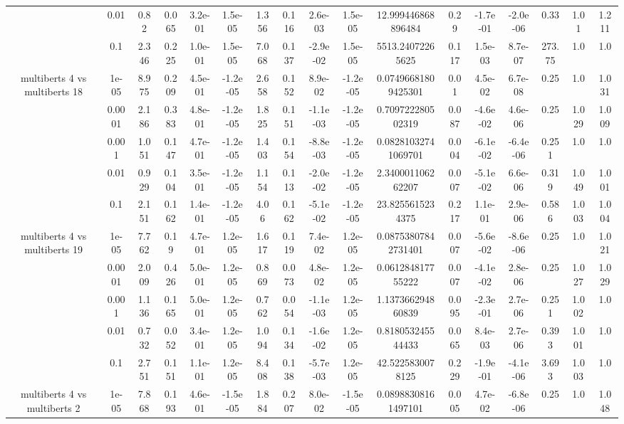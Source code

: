 \begin{tabular}{|c|c|c|c|c|c|c|c|c|c|c|c|c|c|c|c|c|}
 & 0.01 & 0.82 & 0.065 & 3.2e-01 & 1.5e-05 & 1.356 & 0.116 & 2.6e-03 & 1.5e-05 & 12.999446868896484 & 0.29 & -1.7e-01 & -2.0e-06 & 0.33 & 1.01 & 1.211 \\
 & 0.1 & 2.346 & 0.225 & 1.0e-01 & 1.5e-05 & 7.068 & 0.137 & -2.9e-02 & 1.5e-05 & 5513.24072265625 & 0.117 & 1.5e-03 & 8.7e-07 & 273.75 & 1.0 & 1.0 \\
\hline
\multirow{5}{*}{multiberts 4 vs multiberts 18} & 1e-05 & 8.975 & 0.209 & 4.5e-01 & -1.2e-05 & 2.658 & 0.152 & 8.9e-02 & -1.2e-05 & 0.07496681809425301 & 0.01 & 4.5e-02 & 6.7e-08 & 0.25 & 1.0 & 1.031 \\
 & 0.0001 & 2.186 & 0.383 & 4.8e-01 & -1.2e-05 & 1.825 & 0.151 & -1.1e-03 & -1.2e-05 & 0.709722280502319 & 0.087 & -4.6e-02 & 4.6e-06 & 0.25 & 1.029 & 1.009 \\
 & 0.001 & 1.051 & 0.147 & 4.7e-01 & -1.2e-05 & 1.403 & 0.154 & -8.8e-03 & -1.2e-05 & 0.08281032741069701 & 0.004 & -6.1e-02 & -6.4e-06 & 0.251 & 1.0 & 1.0 \\
 & 0.01 & 0.929 & 0.104 & 3.5e-01 & -1.2e-05 & 1.154 & 0.113 & -2.0e-02 & -1.2e-05 & 2.340001106262207 & 0.007 & -5.1e-02 & 6.6e-06 & 0.319 & 1.049 & 1.001 \\
 & 0.1 & 2.151 & 0.162 & 1.4e-01 & -1.2e-05 & 4.06 & 0.162 & -5.1e-02 & -1.2e-05 & 23.8255615234375 & 0.217 & 1.1e-01 & 2.9e-06 & 0.586 & 1.003 & 1.004 \\
\hline
\multirow{5}{*}{multiberts 4 vs multiberts 19} & 1e-05 & 7.762 & 0.19 & 4.7e-01 & 1.2e-05 & 1.617 & 0.119 & 7.4e-02 & 1.2e-05 & 0.08753807842731401 & 0.007 & -5.6e-02 & -8.6e-06 & 0.25 & 1.0 & 1.021 \\
 & 0.0001 & 2.009 & 0.426 & 5.0e-01 & 1.2e-05 & 0.869 & 0.073 & 4.8e-02 & 1.2e-05 & 0.061284817755222 & 0.007 & -4.1e-02 & 2.8e-06 & 0.25 & 1.027 & 1.029 \\
 & 0.001 & 1.136 & 0.165 & 5.0e-01 & 1.2e-05 & 0.762 & 0.054 & -1.1e-03 & 1.2e-05 & 1.137366294860839 & 0.095 & -2.3e-01 & 2.7e-06 & 0.251 & 1.002 & 1.0 \\
 & 0.01 & 0.732 & 0.052 & 3.4e-01 & 1.2e-05 & 1.094 & 0.134 & -1.6e-02 & 1.2e-05 & 0.818053245544433 & 0.065 & 8.4e-03 & 2.7e-06 & 0.393 & 1.001 & 1.0 \\
 & 0.1 & 2.751 & 0.151 & 1.1e-01 & 1.2e-05 & 8.408 & 0.138 & -5.7e-03 & 1.2e-05 & 42.5225830078125 & 0.229 & -1.9e-01 & -4.1e-06 & 3.693 & 1.003 & 1.0 \\
\hline
\multirow{5}{*}{multiberts 4 vs multiberts 2} & 1e-05 & 7.868 & 0.193 & 4.6e-01 & -1.5e-05 & 1.884 & 0.207 & 8.0e-02 & -1.5e-05 & 0.08988308161497101 & 0.005 & 4.7e-02 & -6.8e-06 & 0.25 & 1.0 & 1.048 \\

\end{tabular}
